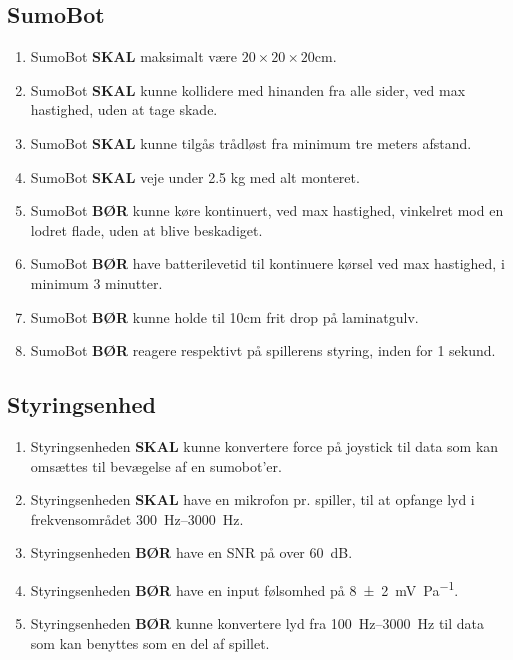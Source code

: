 \subsection{SumoBot}
\begin{enumerate}
    \item SumoBot \textbf{SKAL} maksimalt være $20 \times 20 \times 20$cm.
    \item SumoBot \textbf{SKAL} kunne kollidere med hinanden fra alle sider, ved max hastighed, uden at tage skade.
    \item SumoBot \textbf{SKAL} kunne tilgås trådløst fra minimum tre meters afstand.
    \item SumoBot \textbf{SKAL} veje under 2.5 kg med alt monteret.
    \item SumoBot \textbf {BØR} kunne køre kontinuert, ved max hastighed, vinkelret mod en lodret flade, uden at blive beskadiget.
    \item SumoBot \textbf{BØR} have batterilevetid til kontinuere kørsel ved max hastighed, i minimum 3 minutter.
    \item SumoBot \textbf{BØR} kunne holde til 10cm frit drop på laminatgulv.
    \item SumoBot \textbf{BØR} reagere respektivt på spillerens styring, inden for 1 sekund.
\end{enumerate}


\subsection{Styringsenhed}
\begin{enumerate}
    \item Styringsenheden \textbf{SKAL} kunne konvertere force på joystick til data som kan omsættes til bevægelse af en \gls{sumobot}'er.
    \item Styringsenheden \textbf{SKAL} have en mikrofon pr. spiller, til at opfange lyd i frekvensområdet \SIrange{300}{3000}{\hertz}.
    \item Styringsenheden \textbf{BØR} have en \ac{SNR} på over \SI{60}{\dB}.
    \item Styringsenheden \textbf{BØR} have en input følsomhed på \SI{8(2)}{\milli\volt\per\pascal}.
    \item Styringsenheden \textbf{BØR} kunne konvertere lyd fra \SIrange{100}{3000}{\hertz} til data som kan benyttes som en del af spillet.
\end{enumerate}